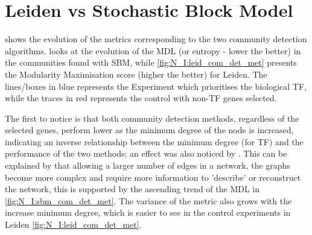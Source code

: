 \section{Leiden vs Stochastic Block Model} \label{s:N_I:sel_tf_com_det}

 shows the evolution of the metrics corresponding to the two community detection algorithms.  looks at the evolution of the MDL (or entropy - lower the better) in the communities found with SBM, while \cref{fig:N_I:leid_com_det_met} presents the Modularity Maximisation score (higher the better) for Leiden. The lines/boxes in blue represents the Experiment which prioritises the biological TF, while the traces in red represents the control with non-TF genes selected. 

The first to notice is that both community detection methods, regardless of the selected genes, perform lower as the minimum degree of the node is increased, indicating an inverse relationship between the minimum degree (for TF) and the performance of the two methods; an effect was also noticed by \citet{Care2019-ij}. This can be explained by that allowing a larger number of edges in a network, the graphs become more complex and require more information to 'describe' or reconstruct the network, this is supported by the ascending trend of the MDL in \cref{fig:N_I:sbm_com_det_met}. The variance of the metric also grows with the increase minimum degree, which is easier to see in the control experiments in Leiden \cref{fig:N_I:leid_com_det_met}.

